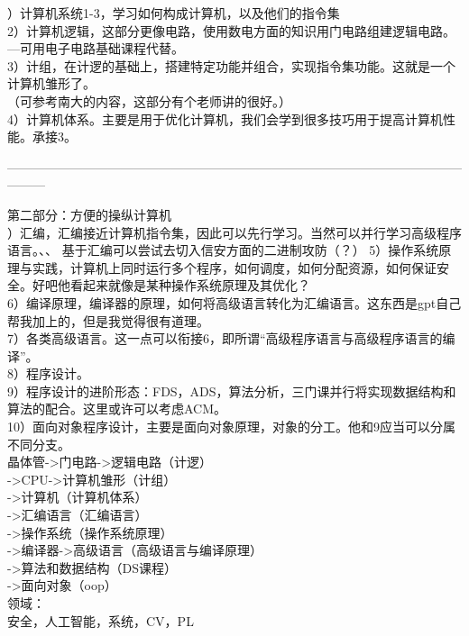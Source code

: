 \documentclass{article}
\begin{document}
）计算机系统1-3，学习如何构成计算机，以及他们的指令集\\
2）计算机逻辑，这部分更像电路，使用数电方面的知识用门电路组建逻辑电路。---可用电子电路基础课程代替。\\
3）计组，在计逻的基础上，搭建特定功能并组合，实现指令集功能。这就是一个计算机雏形了。\\
（可参考南大的内容，这部分有个老师讲的很好。）\\
4）计算机体系。主要是用于优化计算机，我们会学到很多技巧用于提高计算机性能。承接3。

\begin{center}
    ———————————————————————————————————————
\end{center}
第二部分：方便的操纵计算机\\

）汇编，汇编接近计算机指令集，因此可以先行学习。当然可以并行学习高级程序语言。、、
基于汇编可以尝试去切入信安方面的二进制攻防（？）
5）操作系统原理与实践，计算机上同时运行多个程序，如何调度，如何分配资源，如何保证安全。好吧他看起来就像是某种操作系统原理及其优化？\\
6）编译原理，编译器的原理，如何将高级语言转化为汇编语言。这东西是gpt自己帮我加上的，但是我觉得很有道理。\\
7）各类高级语言。这一点可以衔接6，即所谓“高级程序语言与高级程序语言的编译”。\\
8）程序设计。\\
9）程序设计的进阶形态：FDS，ADS，算法分析，三门课并行将实现数据结构和算法的配合。这里或许可以考虑ACM。\\
10）面向对象程序设计，主要是面向对象原理，对象的分工。他和9应当可以分属不同分支。\\

\noindent
晶体管->门电路->逻辑电路（计逻）\\
->CPU->计算机雏形（计组）\\
->计算机（计算机体系）\\

\noindent
->汇编语言（汇编语言）\\
->操作系统（操作系统原理）\\
->编译器->高级语言（高级语言与编译原理）\\
->算法和数据结构（DS课程）\\
->面向对象（oop）\\

\noindent
领域：\\
安全，人工智能，系统，CV，PL\\
\end{document}
